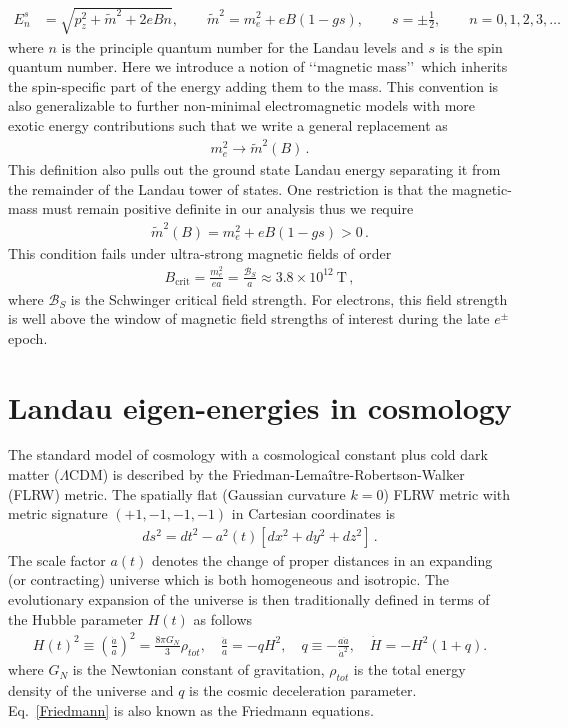 \documentclass[Universe,article,submit,moreauthors,pdftex]{Definitions/mdpi}
\newcommand*{\req}[1]{Eq.~{\eqref{#1}}}
\begin{document}
\begin{align}
  \label{KGPEnergy} E_{n}^{s}&=\sqrt{p^2_z+\tilde{m}^2+2eBn},\qquad\tilde{m}^2=m^2_e+eB\left(1-gs\right),\qquad s=\pm\frac{1}{2},\qquad n=0,1,2,3,\dots
\end{align}
where $n$ is the principle quantum number for the Landau levels and $s$ is the spin quantum number. Here we introduce a notion of \lq\lq magnetic mass\rq\rq\ which inherits the spin-specific part of the energy adding them to the mass. This convention is also generalizable to further non-minimal electromagnetic models with more exotic energy contributions such that we write a general replacement as
\begin{align}
  \label{MagMass} m_{e}^{2}\rightarrow\tilde{m}^2(B)\,.
\end{align}
This definition also pulls out the ground state Landau energy separating it from the remainder of the Landau tower of states. One restriction is that the magnetic-mass must remain positive definite in our analysis thus we require
\begin{align}
  \label{MassLimit} \tilde{m}^2(B)=m^2_e+eB\left(1-gs\right)>0\,.
\end{align}
This condition fails under ultra-strong magnetic fields of order
\begin{align}
  \label{MagMassFail} B_{\mathrm{crit}}=\frac{m_{e}^{2}}{ea}=\frac{\mathcal{B}_{S}}{a}\approx3.8\times10^{12}\ \mathrm{T}\,,
\end{align}
where $\mathcal{B}_{S}$ is the Schwinger critical field strength. For electrons, this field strength is well above the window of magnetic field strengths of interest during the late $e^{\pm}$ epoch.

\section{Landau eigen-energies in cosmology}
\noindent The standard model of cosmology with a cosmological constant plus cold dark matter ($\Lambda\mathrm{CDM}$) is described by the Friedman-Lemaître-Robertson-Walker (FLRW) metric. The spatially flat (Gaussian curvature $k=0$) FLRW metric with metric signature $(+1,-1,-1,-1)$ in Cartesian coordinates is
\begin{align}
    \label{FLRW} ds^2=dt^2-a^2(t)\left[dx^2+dy^2+dz^2\right]\,.
\end{align}
The scale factor $a(t)$ denotes the change of proper distances in an expanding (or contracting) universe which is both homogeneous and isotropic. The evolutionary expansion of the universe is then traditionally defined in terms of the Hubble parameter $H(t)$ as follows
\begin{align}
  \label{Friedmann} H(t)^{2}\equiv\left(\frac{\dot a}{a}\right)^2=\frac{8\pi G_{N}}{3}\rho_{tot},\quad \frac{\ddot a}{a}=-qH^2,\quad 
q\equiv -\frac{a\ddot a}{\dot a^2},\quad \dot H=-H^2(1+q).
\end{align}
where $G_N$ is the Newtonian constant of gravitation, $\rho_{tot}$ is the total energy density of the universe and $q$ is the cosmic deceleration parameter. \req{Friedmann} is also known as the Friedmann equations. 
\end{document}
